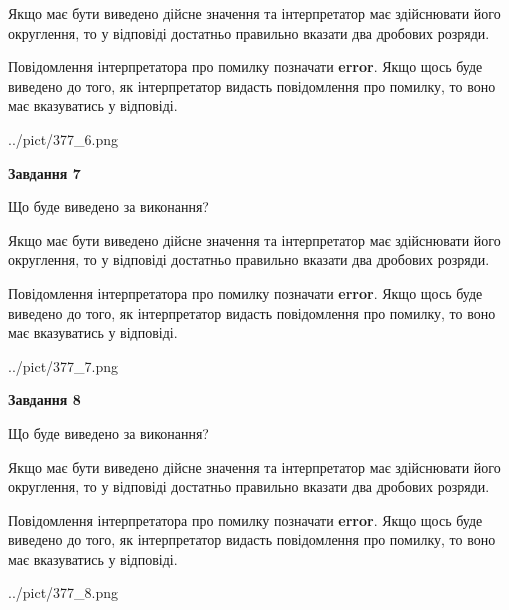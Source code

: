 \documentclass[12pt, ukrainian]{article}
\begin{document}
{\begin {Large}
Якщо має бути виведено дійсне значення та інтерпретатор має здійснювати його округлення, 
то у відповіді достатньо правильно вказати два дробових розряди.

Повідомлення інтерпретатора про помилку позначати \textbf{error}.
Якщо щось буде виведено до того, як інтерпретатор видасть повідомлення про помилку, 
то воно має вказуватись у відповіді. \par

\begin{center}
	{../pict/377_6.png}
\end{center}
\newpage

{\begin {center}\textbf{Завдання 7}\end {center}}\par
Що буде виведено за виконання? \par

Якщо має бути виведено дійсне значення та інтерпретатор має здійснювати його округлення, 
то у відповіді достатньо правильно вказати два дробових розряди.

Повідомлення інтерпретатора про помилку позначати \textbf{error}.
Якщо щось буде виведено до того, як інтерпретатор видасть повідомлення про помилку, 
то воно має вказуватись у відповіді. \par

\begin{center}
	{../pict/377_7.png}
\end{center}
\newpage

{\begin {center}\textbf{Завдання 8}\end {center}}\par
Що буде виведено за виконання? \par

Якщо має бути виведено дійсне значення та інтерпретатор має здійснювати його округлення, 
то у відповіді достатньо правильно вказати два дробових розряди.

Повідомлення інтерпретатора про помилку позначати \textbf{error}.
Якщо щось буде виведено до того, як інтерпретатор видасть повідомлення про помилку, 
то воно має вказуватись у відповіді. \par

\begin{center}
	{../pict/377_8.png}
\end{center}
\newpage


\end{Large}}
\end{document}
